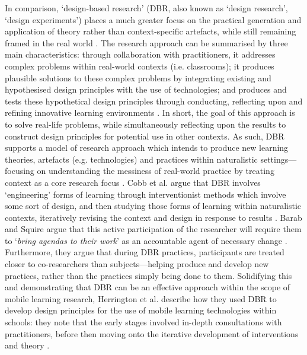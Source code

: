 In comparison, `design-based research' (DBR, also known as `design research', `design experiments') places a much greater focus on the practical generation and application of theory rather than context-specific artefacts, while still remaining framed in the real world \citep{zimmerman2007}. The research approach can be summarised by three main characteristics: through collaboration with practitioners, it addresses complex problems within real-world contexts (i.e. classrooms); it produces plausible solutions to these complex problems by integrating existing and hypothesised design principles with the use of technologies; and produces and tests these hypothetical design principles through conducting, reflecting upon and refining innovative learning environments \citep{reeves2000, brown1992, collins1992}. In short, the goal of this approach is to solve real-life problems, while simultaneously reflecting upon the results to construct design principles for potential use in other contexts. As such, DBR supports a model of research approach which intends to produce new learning theories, artefacts (e.g. technologies) and practices within naturalistic settings---focusing on understanding the messiness of real-world practice by treating context as a core research focus \citep{Barab2004}. Cobb et al. argue that DBR involves `engineering' forms of learning through interventionist methods which involve some sort of design, and then studying those forms of learning within naturalistic contexts, iteratively revising the context and design in response to results \citep{cobb2003}. Barab and Squire argue that this active participation of the researcher will require them to `\textit{bring agendas to their work}' as an accountable agent of necessary change \citep{Barab2004}. Furthermore, they argue that during DBR practices, participants are treated closer to co-researchers than subjects---helping produce and develop new practices, rather than the practices simply being done to them. Solidifying this and demonstrating that DBR can be an effective approach within the scope of mobile learning research, Herrington et al. describe how they used DBR to develop design principles for the use of mobile learning technologies within schools: they note that the early stages involved in-depth consultations with practitioners, before then moving onto the iterative development of interventions and theory \citep{herrington2009}.


